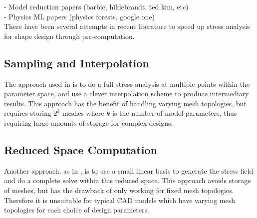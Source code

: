 - Model reduction papers (barbic, hildebrandt, ted kim, etc)\\
- Physics ML papers (physics forests, google one)\\


There have been several attempts in recent literature to speed up stress analysis for shape design through pre-computation.
\subsection{Sampling and Interpolation}

The approach used in \cite{Schulz-17} is to do a full stress analysis at multiple points within the parameter space, and use a clever interpolation scheme to produce intermediary results. This approach has the benefit of handling varying mesh topologies, but requires storing $2^k$ meshes where $k$ is the number of model parameters, thus requiring large amounts of storage for complex designs.



\subsection{Reduced Space Computation}

Another approach, as in \cite{Chen-16}, is to use a small linear basis to generate the stress field and do a complete solve within this reduced space. This approach avoids storage of meshes, but has the drawback of only working for fixed mesh topologies. Therefore it is unsuitable for typical CAD models which have varying mesh topologies for each choice of design parameters.